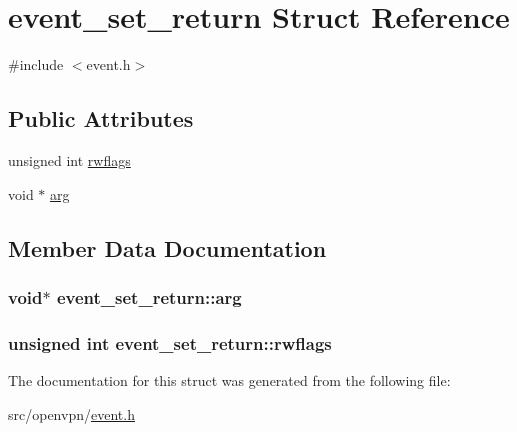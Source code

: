 \hypertarget{structevent__set__return}{}\section{event\+\_\+set\+\_\+return Struct Reference}
\label{structevent__set__return}


{\ttfamily \#include $<$event.\+h$>$}

\subsection*{Public Attributes}
\begin{DoxyCompactItemize}
\item 
unsigned int \hyperlink{structevent__set__return_a717924e2f91f3ed974e4ff9ac74590c7}{rwflags}
\item 
void $\ast$ \hyperlink{structevent__set__return_aa0ce103a9a087d82e1ff103a6d2be6dd}{arg}
\end{DoxyCompactItemize}


\subsection{Member Data Documentation}
\hypertarget{structevent__set__return_aa0ce103a9a087d82e1ff103a6d2be6dd}{}
\subsubsection[{arg}]{\setlength{\rightskip}{0pt plus 5cm}void$\ast$ event\+\_\+set\+\_\+return\+::arg}\label{structevent__set__return_aa0ce103a9a087d82e1ff103a6d2be6dd}
\hypertarget{structevent__set__return_a717924e2f91f3ed974e4ff9ac74590c7}{}
\subsubsection[{rwflags}]{\setlength{\rightskip}{0pt plus 5cm}unsigned int event\+\_\+set\+\_\+return\+::rwflags}\label{structevent__set__return_a717924e2f91f3ed974e4ff9ac74590c7}


The documentation for this struct was generated from the following file\+:\begin{DoxyCompactItemize}
\item 
src/openvpn/\hyperlink{event_8h}{event.\+h}\end{DoxyCompactItemize}
